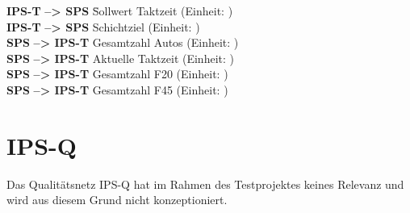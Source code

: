 \begin{tabbing}
    \textbf{IPS-T}    \= \textbf{--> SPS}   \hspace{.5cm}\= Sollwert Taktzeit (Einheit: ) \\
    \textbf{IPS-T}    \> \textbf{--> SPS}   \> Schichtziel (Einheit: \einh{}{\cars}) \\
    \textbf{SPS  }    \> \textbf{--> IPS-T} \> Gesamtzahl Autos (Einheit: \einh{}{\cars})\\
    \textbf{SPS  }    \> \textbf{--> IPS-T} \> Aktuelle Taktzeit (Einheit: )\\
    \textbf{SPS  }    \> \textbf{--> IPS-T} \> Gesamtzahl F20 (Einheit: \einh{}{\cars})\\
    \textbf{SPS  }    \> \textbf{--> IPS-T} \> Gesamtzahl F45 (Einheit: \einh{}{\cars})
\end{tabbing}







\section{IPS-Q}
\label{sec:ips_q}

Das Qualitätsnetz IPS-Q hat im Rahmen des Testprojektes keines Relevanz und wird aus diesem Grund nicht konzeptioniert.